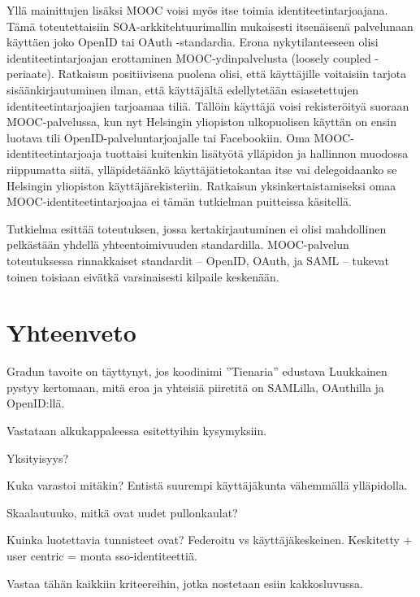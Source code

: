 \documentclass[finnish,gradu]{tktltiki}
\begin{document}
  Yllä mainittujen lisäksi MOOC voisi myös itse toimia identiteetintarjoajana. Tämä toteutettaisiin SOA-arkkitehtuurimallin mukaisesti itsenäisenä palvelunaan käyttäen joko OpenID tai OAuth -standardia. Erona nykytilanteeseen olisi identiteetintarjoajan erottaminen MOOC-ydinpalvelusta (loosely coupled -periaate). Ratkaisun positiivisena puolena olisi, että käyttäjille voitaisiin tarjota sisäänkirjautuminen ilman, että käyttäjältä edellytetään esiasetettujen identiteetintarjoajien tarjoamaa tiliä. Tällöin käyttäjä voisi rekisteröityä suoraan MOOC-palvelussa, kun nyt Helsingin yliopiston ulkopuolisen käyttän on ensin luotava tili OpenID-palveluntarjoajalle tai Facebookiin. Oma MOOC-identiteetintarjoaja tuottaisi kuitenkin lisätyötä ylläpidon ja hallinnon muodossa riippumatta siitä, ylläpidetäänkö käyttäjätietokantaa itse vai delegoidaanko se Helsingin yliopiston käyttäjärekisteriin. Ratkaisun yksinkertaistamiseksi omaa MOOC-identiteetintarjoajaa ei tämän tutkielman puitteissa käsitellä.

  Tutkielma esittää toteutuksen, jossa kertakirjautuminen ei olisi mahdollinen pelkästään yhdellä yhteentoimivuuden standardilla. MOOC-palvelun toteutuksessa rinnakkaiset standardit -- OpenID, OAuth, ja SAML -- tukevat toinen toisiaan eivätkä varsinaisesti kilpaile keskenään.




  \section{Yhteenveto} %
  \label{sec:yhteenveto}

    Gradun tavoite on täyttynyt, jos koodinimi ''Tienaria'' edustava Luukkainen pystyy kertomaan, mitä eroa ja yhteisiä piiretitä on SAMLilla, OAuthilla ja OpenID:llä.

    Vastataan alkukappaleessa esitettyihin kysymyksiin.

    Yksityisyys? %

    Kuka varastoi mitäkin? Entistä suurempi käyttäjäkunta vähemmällä ylläpidolla.

    Skaalautuuko, mitkä ovat uudet pullonkaulat?

    Kuinka luotettavia tunnisteet ovat? Federoitu vs käyttäjäkeskeinen. Keskitetty + user centric = monta sso-identiteettiä.

    Vastaa tähän kaikkiin kriteereihin, jotka nostetaan esiin kakkosluvussa.
\end{document}
